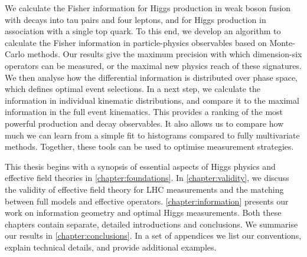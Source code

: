 We calculate the Fisher information for Higgs production in weak boson
fusion with decays into tau pairs and four leptons, and for Higgs
production in association with a single top quark. To this end, we
develop an algorithm to calculate the Fisher information in
particle-physics observables based on Monte-Carlo methods. Our results
give the maximum precision with which dimension-six operators can be
measured, or the maximal new physics reach of these
signatures. We then analyse how the differential information is
distributed over phase space, which defines optimal event
selections. In a next step, we calculate the information in individual
kinematic distributions, and compare it to the maximal information in
the full event kinematics. This provides a ranking of the most
powerful production and decay observables. It also allows us to
compare how much we can learn from a simple fit to histograms compared
to fully multivariate methods. Together, these tools can be used to
optimise measurement strategies.

\newparagraph
%
This thesis begins with a synopsis of essential aspects of Higgs
physics and effective field theories in
\autoref{chapter:foundations}. In \autoref{chapter:validity}, we
discuss the validity of effective field theory for LHC measurements
and the matching between full models and effective
operators. \autoref{chapter:information} presents our work on
information geometry and optimal Higgs measurements. Both these
chapters contain separate, detailed introductions and conclusions. We
summarise our results in \autoref{chapter:conclusions}. In a set of
appendices we list our conventions, explain technical details, and
provide additional examples.
